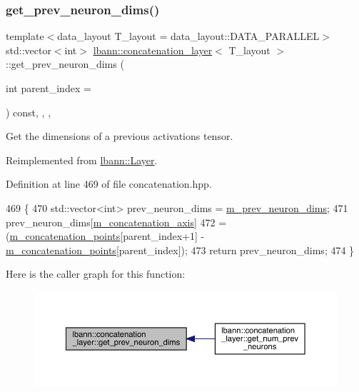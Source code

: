 \subsubsection{\texorpdfstring{get\+\_\+prev\+\_\+neuron\+\_\+dims()}{get\_prev\_neuron\_dims()}}
{\footnotesize\ttfamily template$<$data\+\_\+layout T\+\_\+layout = data\+\_\+layout\+::\+D\+A\+T\+A\+\_\+\+P\+A\+R\+A\+L\+L\+EL$>$ \\
std\+::vector$<$int$>$ \hyperlink{classlbann_1_1concatenation__layer}{lbann\+::concatenation\+\_\+layer}$<$ T\+\_\+layout $>$\+::get\+\_\+prev\+\_\+neuron\+\_\+dims (\begin{DoxyParamCaption}\item[{int}]{parent\+\_\+index = {} }\end{DoxyParamCaption}) const\hspace{0.3cm}{\ttfamily [inline]}, {\ttfamily [override]}, {\ttfamily [protected]}, {\ttfamily [virtual]}}

Get the dimensions of a previous activations tensor. 

Reimplemented from \hyperlink{classlbann_1_1Layer_a1acc0fa44acdeffbac158fdac3467973}{lbann\+::\+Layer}.



Definition at line 469 of file concatenation.\+hpp.


\begin{DoxyCode}
469                                                                            \{
470     std::vector<int> prev\_neuron\_dims = \hyperlink{classlbann_1_1Layer_ae204d1a2a79606eaa117273857ff62a3}{m\_prev\_neuron\_dims};
471     prev\_neuron\_dims[\hyperlink{classlbann_1_1concatenation__layer_a4ac4a931dc85d622e9ea8fddb9625d38}{m\_concatenation\_axis}]
472       = (\hyperlink{classlbann_1_1concatenation__layer_a363324fe6cd104740334f3396085328c}{m\_concatenation\_points}[parent\_index+1] - 
      \hyperlink{classlbann_1_1concatenation__layer_a363324fe6cd104740334f3396085328c}{m\_concatenation\_points}[parent\_index]);
473     \textcolor{keywordflow}{return} prev\_neuron\_dims;
474   \}
\end{DoxyCode}
Here is the caller graph for this function\+:\nopagebreak
\begin{figure}[H]
\begin{center}
\leavevmode
\includegraphics[width=350pt]{classlbann_1_1concatenation__layer_af0e60f4a7e00657ceb429aaa8d7f5040_icgraph}
\end{center}
\end{figure}
\mbox{\label{classlbann_1_1concatenation__layer_a5c6edd4ca11a102b809987851f51e2d4}} 
